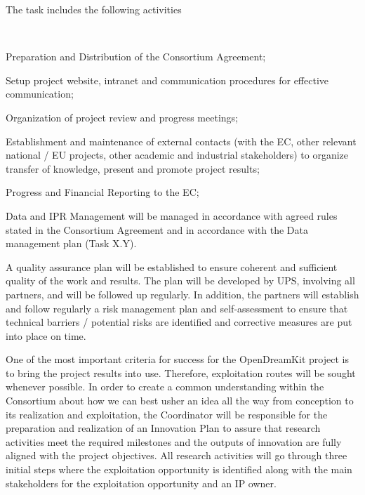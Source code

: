 \begin{workpackage}
\begin{tasklist}
\begin{task}[title=Project and financial management,
id=project-finance-management,lead=PS,PM=33]
The task includes the following activities
  \begin{compactitem}
\item Preparation and Distribution of the Consortium Agreement;
\item Setup project website, intranet and communication procedures for effective communication;
\item Organization of project review and progress meetings;
\item Establishment and maintenance of external contacts (with the EC, 
other relevant national / EU projects, other academic and industrial stakeholders) to organize transfer of knowledge, present and
promote project results;
\item Progress and Financial Reporting to the EC;
\item Data and IPR Management will be managed in accordance with agreed rules stated in the
Consortium Agreement and in accordance with the Data management plan (Task X.Y).
  \end{compactitem}
\end{task}

\begin{task}[title=Quality assurance and risk management,
id=project-finance-management,lead=PS,PM=15]
A quality assurance plan will be established to ensure coherent and sufficient quality of the work
and results. The plan will be developed by UPS, involving all partners, and will be followed up
regularly. In addition, the partners will establish and follow regularly a risk management plan
and self-assessment to ensure that technical barriers / potential risks are identified  and corrective measures are put into place on time.
\end{task}

\begin{task}[title=Innovation management,
id=project-finance-management,lead=PS,PM=10]

One of the most important criteria for success for the OpenDreamKit project is to bring the project results into use. Therefore, exploitation routes will be sought whenever possible. In
order to create a common understanding within the Consortium about how we can best usher
an idea all the way from conception to its realization and exploitation, the Coordinator will be responsible for
the preparation and realization of an Innovation Plan to assure that research activities meet the
required milestones and the outputs of innovation are fully aligned with the project objectives.
All research activities will go through three initial steps where the exploitation opportunity is
identified along with the main stakeholders for the exploitation opportunity and an IP owner.
\end{task}
\end{tasklist}


\end{workpackage}
